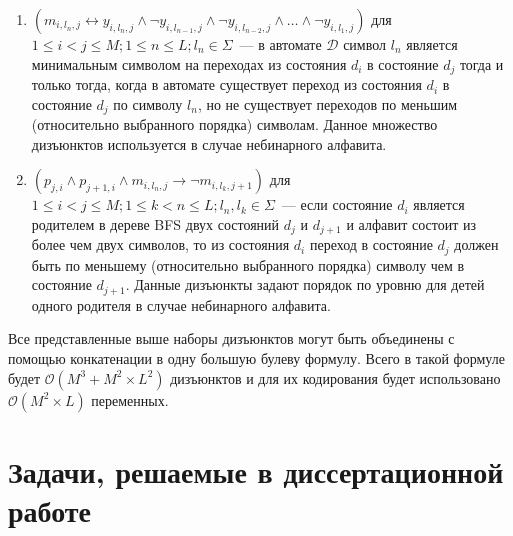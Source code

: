 \begin{enumerate}
  \item $\left(m_{i,l_{n},j} \leftrightarrow y_{i,l_{n},j} \wedge \neg y_{i,l_{n - 1}, j} \wedge \neg y_{i,l_{n - 2}, j} \wedge \ldots \wedge \neg y_{i,l_{1},j} \right)$ для $1 \leq i < j \leq M; 1 \leq n \leq L;l_{n} \in \Sigma$~{---} в автомате $\mathcal{D}$ символ $l_{n}$ является минимальным символом на переходах из состояния $d_{i}$ в состояние $d_{j}$ тогда и только тогда, когда в автомате существует переход из состояния $d_{i}$ в состояние $d_{j}$ по символу $l_{n}$, но не существует переходов по меньшим (относительно выбранного порядка) символам.
  Данное множество дизъюнктов используется в случае небинарного алфавита.

  \item $\left(p_{j,i} \wedge p_{j + 1, i} \wedge m_{i,l_{n}, j} \rightarrow \neg m_{i, l_{k}, j + 1}\right)$ для $1 \leq i < j \leq M; 1 \leq k < n \leq L;l_n,l_k \in \Sigma$~{---} если состояние $d_{i}$ является родителем в дереве BFS двух состояний $d_{j}$ и $d_{j + 1}$ и алфавит состоит из более чем двух символов, то из состояния $d_{i}$ переход в состояние $d_{j}$ должен быть по меньшему (относительно выбранного порядка) символу чем в состояние $d_{j + 1}$.
  Данные дизъюнкты задают порядок по уровню для детей одного родителя в случае небинарного алфавита.
\end{enumerate}

Все представленные выше наборы дизъюнктов могут быть объединены с помощью конкатенации в одну большую булеву формулу. Всего в такой формуле будет $\mathcal{O}(M^{3} + M^{2} \times L^{2})$ дизъюнктов и для их кодирования будет использовано $\mathcal{O}(M^2 \times L)$ переменных.


\section{Задачи, решаемые в диссертационной работе}
\label{sec:review:tasks}


